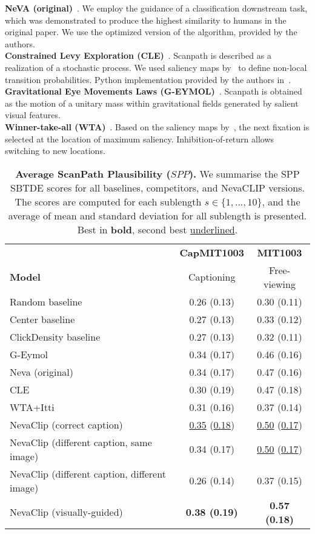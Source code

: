 \documentclass{article}
\begin{document}
\textbf{NeVA (original)}~\citep{schwinn2022behind}. We employ the guidance of a classification downstream task, which was demonstrated to produce the highest similarity to humans in the original paper. We use the optimized version of the algorithm, provided by the authors.\\
\textbf{Constrained Levy Exploration (CLE)}~\citep{boccignone2004modelling}. Scanpath is described as a realization of a stochastic process. We used saliency maps by~\citep{itti1998model} to define non-local transition probabilities. Python implementation provided by the authors in~\citep{boccignone2019look}.\\
\textbf{Gravitational Eye Movements Laws (G-EYMOL)}~\citep{zanca2019gravitational}. Scanpath is obtained as the motion of a unitary mass within gravitational fields generated by salient visual features.\\
\textbf{Winner-take-all (WTA)}~\citep{koch1987shifts}. Based on the saliency maps by~\citet{itti1998model}, the next fixation is selected at the location of maximum saliency. Inhibition-of-return allows switching to new locations.


\begin{table}[t]
\caption{\textbf{Average ScanPath Plausibility ($SPP$).} We summarise the SPP SBTDE scores for all baselines, competitors, and NevaCLIP versions. The scores are computed for each sublength $s \in \{1, ..., 10\}$, and the average of mean and standard deviation for all sublength is presented. Best in \textbf{bold}, second best \underline{underlined}.}
\centering
\begin{tabular}{lcc}
\hline
\textbf{} & \textbf{CapMIT1003} & \textbf{MIT1003} \\
\textbf{Model} & Captioning & Free-viewing \\
\hline
\hline
Random baseline & 0.26 (0.13) & 0.30 (0.11)  \\
Center baseline & 0.27 (0.13) & 0.33 (0.12) \\
ClickDensity baseline & 0.27 (0.13) & 0.32 (0.11) \\
\hline
G-Eymol & 0.34 (0.17) & 0.46 (0.16) \\
Neva (original) & 0.34 (0.17)
 & 0.47 (0.16) \\
CLE & 0.30 (0.19)
 & 0.47 (0.18) \\
WTA+Itti & 0.31 (0.16) & 0.37 (0.14) \\
\hline
NevaClip (correct caption) & \underline{0.35} (\underline{0.18}) & \underline{0.50} (\underline{0.17}) \\
NevaClip (different caption, same image) & 0.34 (0.17) & \underline{0.50} (\underline{0.17}) \\
NevaClip (different caption, different image) & 0.26 (0.14) & 0.37 (0.15) \\
NevaClip (visually-guided) & \textbf{0.38 (0.19)} & \textbf{0.57 (0.18)} \\
\hline
\end{tabular}
\label{tab:all_results}
\end{table}
\end{document}
